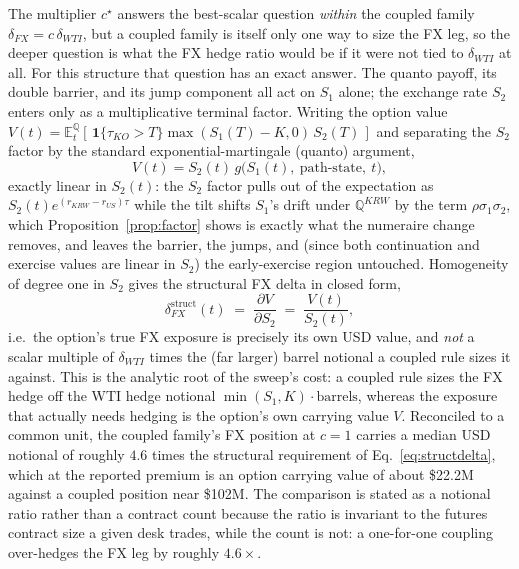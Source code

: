 \documentclass[11pt,a4paper]{article}
\begin{document}
The multiplier $c^\star$ answers the best-scalar question \emph{within} the coupled family $\delta_{FX}=c\,\delta_{WTI}$, but a coupled family is itself only one way to size the FX leg, so the deeper question is what the FX hedge ratio would be if it were not tied to $\delta_{WTI}$ at all. For this structure that question has an exact answer. The quanto payoff, its double barrier, and its jump component all act on $S_1$ alone; the exchange rate $S_2$ enters only as a multiplicative terminal factor. Writing the option value $V(t)=\mathbb E_t^{\mathbb Q}[\,\mathbf 1\{\tau_{KO}>T\}\max(S_1(T)-K,0)\,S_2(T)\,]$ and separating the $S_2$ factor by the standard exponential-martingale (quanto) argument,
\begin{equation}
\label{eq:homog}
V(t) = S_2(t)\,g\bigl(S_1(t),\ \text{path-state},\ t\bigr),
\end{equation}
exactly linear in $S_2(t)$: the $S_2$ factor pulls out of the expectation as $S_2(t)e^{(r_{KRW}-r_{US})\tau}$ while the tilt shifts $S_1$'s drift under $\mathbb Q^{KRW}$ by the term $\rho\sigma_1\sigma_2$, which Proposition~\ref{prop:factor} shows is exactly what the numeraire change removes, and leaves the barrier, the jumps, and (since both continuation and exercise values are linear in $S_2$) the early-exercise region untouched. Homogeneity of degree one in $S_2$ gives the structural FX delta in closed form,
\begin{equation}
\label{eq:structdelta}
\delta_{FX}^{\mathrm{struct}}(t) \;=\; \frac{\partial V}{\partial S_2} \;=\; \frac{V(t)}{S_2(t)},
\end{equation}
i.e.\ the option's true FX exposure is precisely its own USD value, and \emph{not} a scalar multiple of $\delta_{WTI}$ times the (far larger) barrel notional a coupled rule sizes it against. This is the analytic root of the sweep's cost: a coupled rule sizes the FX hedge off the WTI hedge notional $\min(S_1,K)\cdot\text{barrels}$, whereas the exposure that actually needs hedging is the option's own carrying value $V$. Reconciled to a common unit, the coupled family's FX position at $c=1$ carries a median USD notional of roughly $4.6$ times the structural requirement of Eq.~\eqref{eq:structdelta}, which at the reported premium is an option carrying value of about \$22.2M against a coupled position near \$102M. The comparison is stated as a notional ratio rather than a contract count because the ratio is invariant to the futures contract size a given desk trades, while the count is not: a one-for-one coupling over-hedges the FX leg by roughly $4.6\times$.
\end{document}
